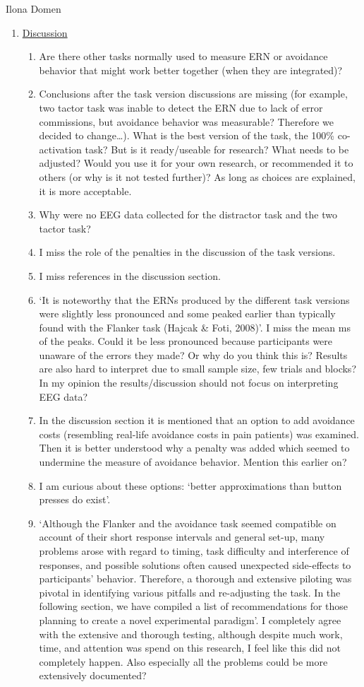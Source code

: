 \documentclass[twocolumn, serif, authordate, review]{jote-article}
\begin{document}
\begin{paracol}{2}
\begin{reviewend}{Ilona Domen}
\begin{enumerate}[label=\textbf{\arabic*}), start=0]
    \item \hyperref[sec:discussion]{Discussion}
        \begin{enumerate}
            \item Are there other tasks normally used to measure ERN or avoidance behavior that might work better together (when they are integrated)?
            \item Conclusions after the task version discussions are missing (for example, two tactor task was inable to detect the ERN due to lack of error commissions, but avoidance behavior was measurable? Therefore we decided to change{\dots}). What is the best version of the task, the 100\% co-activation task? But is it ready/useable for research? What needs to be adjusted? Would you use it for your own research, or recommended it to others (or why is it not tested further)? As long as choices are explained, it is more acceptable.
            \item Why were no EEG data collected for the distractor task and the two tactor task?
            \item I miss the role of the penalties in the discussion of the task versions.
            \item I miss references in the discussion section.
            \item `It is noteworthy that the ERNs produced by the different task versions were slightly less pronounced and some peaked earlier than typically found with the Flanker task (Hajcak \& Foti, 2008)'. I miss the mean ms of the peaks. Could it be less pronounced because participants were unaware of the errors they made? Or why do you think this is? Results are also hard to interpret due to small sample size, few trials and blocks? In my opinion the results/discussion should not focus on interpreting EEG data?
            \item In the discussion section it is mentioned that an option to add avoidance costs (resembling real-life avoidance costs in pain patients) was examined. Then it is better understood why a penalty was added which seemed to undermine the measure of avoidance behavior. Mention this earlier on?
            \item I am curious about these options: `better approximations than button presses do exist'.
            \item `Although the Flanker and the avoidance task seemed compatible on account of their short response intervals and general set-up, many problems arose with regard to timing, task difficulty and interference of responses, and possible solutions often caused unexpected side-effects to participants' behavior. Therefore, a thorough and extensive piloting was pivotal in identifying various pitfalls and re-adjusting the task. In the following section, we have compiled a list of recommendations for those planning to create a novel experimental paradigm'. I completely agree with the extensive and thorough testing, although despite much work, time, and attention was spend on this research, I feel like this did not completely happen. Also especially all the problems could be more extensively documented?

\end{enumerate}
\end{enumerate}
\end{reviewend}
\end{paracol}
\end{document}
